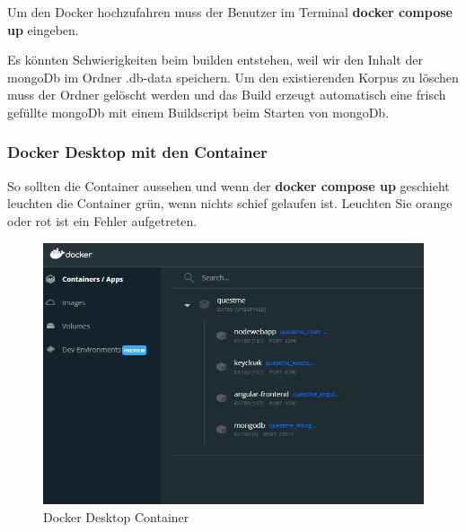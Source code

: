 \noindent Um den Docker hochzufahren muss der Benutzer im Terminal \textbf{docker compose up} eingeben.\newline

\noindent Es könnten Schwierigkeiten beim builden entstehen, weil wir den Inhalt der mongoDb im Ordner 
.db-data speichern. 
Um den existierenden Korpus zu löschen muss der Ordner gelöscht werden und das Build erzeugt automatisch eine frisch gefüllte mongoDb mit einem Buildscript beim Starten von mongoDb.

\subsubsection{Docker Desktop mit den Container}
So sollten die Container aussehen und wenn der \textbf{docker compose up} geschieht leuchten die Container grün, wenn nichts 
schief gelaufen ist. Leuchten Sie orange oder rot ist ein Fehler aufgetreten.

\begin{figure}[H]
    \centering
    \includegraphics[width=1.0\textwidth]{bilder/installationshandbuch/Docker_Container.PNG}
    \caption{Docker Desktop Container}
    \label{fig:Docker_Desktop_Container}
\end{figure}

